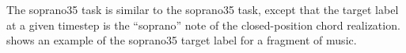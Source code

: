 
The \gls{soprano35} task is similar to the \gls{soprano35}
task, except that the target label at a given timestep is
the ``soprano'' note of the \gls{closed-position} chord
realization.  shows an
example of the \gls{soprano35} target label for a fragment of
music.

